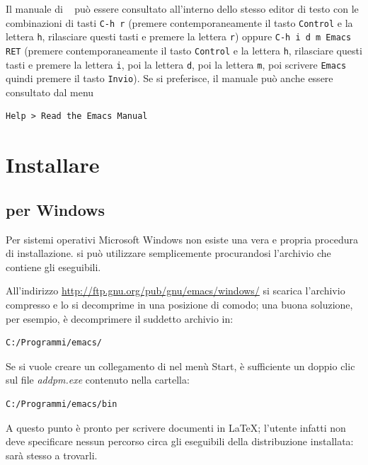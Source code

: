\documentclass[11pt,a4paper]{article}
\begin{document}
Il manuale di \emacs{}~\cite{emacs:stallman} può essere consultato all'interno
dello stesso editor di testo con le combinazioni di tasti \verb!C-h r! (premere
contemporaneamente il tasto \verb!Control! e la lettera \verb!h!, rilasciare
questi tasti e premere la lettera \verb!r!) oppure \verb!C-h i d m Emacs RET!
(premere contemporaneamente il tasto \verb!Control! e la lettera \verb!h!,
rilasciare questi tasti e premere la lettera \verb!i!, poi la lettera \verb!d!,
poi la lettera \verb!m!, poi scrivere \verb!Emacs! quindi premere il tasto
\verb!Invio!).  Se si preferisce, il manuale può anche essere consultato dal
menu
\begin{Verbatim}
Help > Read the Emacs Manual
\end{Verbatim}


\section{Installare \emacs}
\label{sec:install}

\subsection{\emacs{} per Windows}
\label{sec:installwin}


Per sistemi operativi Microsoft Windows non esiste una vera e propria procedura
di installazione. {\emacs} si può utilizzare semplicemente procurandosi
l'archivio che contiene gli eseguibili.

All'indirizzo \url{http://ftp.gnu.org/pub/gnu/emacs/windows/} si scarica
l'archivio compresso  e lo si decomprime in una
posizione di comodo; una buona soluzione, per esempio, è decomprimere il
suddetto archivio in:
\begin{Verbatim}
C:/Programmi/emacs/
\end{Verbatim}

Se si vuole creare un collegamento di \emacs{} nel menù Start, è
sufficiente un doppio clic sul file \emph{addpm.exe} contenuto nella
cartella:
\begin{Verbatim}
C:/Programmi/emacs/bin
\end{Verbatim}

A questo punto \emacs{} è pronto per scrivere documenti in \LaTeX; l'utente
infatti non deve specificare nessun percorso circa gli eseguibili della
distribuzione installata: sarà \emacs{} stesso a trovarli.
\end{document}
